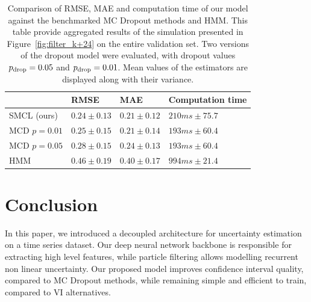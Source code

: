 \documentclass[journal]{IEEEtran}
\begin{document}
\begin{table}[htpb]
	\centering
	\caption{Comparison of RMSE, MAE and computation time of our model against the benchmarked MC Dropout methods and HMM.
		This table provide aggregated results of the simulation presented in Figure~\ref{fig:filter_k+24} on the entire validation set.
		Two versions of the dropout model were evaluated, with dropout values $p_\textnormal{drop}=0.05$ and $p_\textnormal{drop}=0.01$.
		Mean values of the estimators are displayed along with their variance.}
	\label{tab:ci_comparison}
	\begin{tabular}{llll}
		\toprule
		             & RMSE            & MAE             & Computation time  \\
		\toprule
		SMCL (ours)  & $0.24 \pm 0.13$ & $0.21 \pm 0.12$ & $210 ms \pm 75.7$ \\
		MCD $p=0.01$ & $0.25 \pm 0.15$ & $0.21 \pm 0.14$ & $193 ms \pm 60.4$ \\
		MCD $p=0.05$ & $0.28 \pm 0.15$ & $0.24 \pm 0.13$ & $193 ms \pm 60.4$ \\
		HMM          & $0.46 \pm 0.19$ & $0.40 \pm 0.17$ & $994 ms \pm 21.4$ \\
		\bottomrule
	\end{tabular}
\end{table}


\section{Conclusion}%
\label{sec:conclusion}

In this paper, we introduced a decoupled architecture for uncertainty estimation on a time series dataset.
Our deep neural network backbone is responsible for extracting high level features, while particle filtering allows modelling recurrent non linear uncertainty.
Our proposed model improves confidence interval quality, compared to MC Dropout methods, while remaining simple and efficient to train, compared to VI alternatives.
\end{document}

